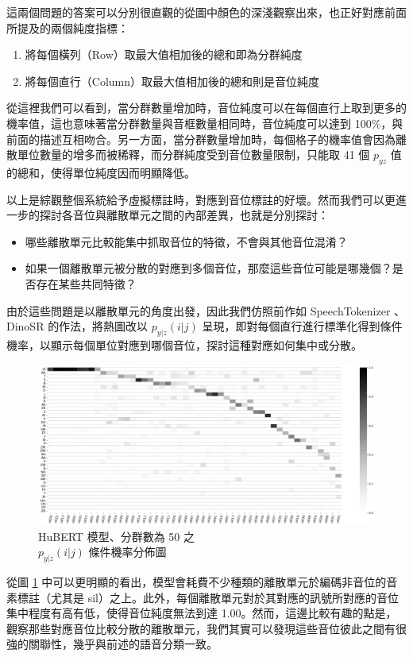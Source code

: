 {        這兩個問題的答案可以分別很直觀的從圖中顏色的深淺觀察出來，也正好對應前面所提及的兩個純度指標：
        \begin{enumerate}
            \item 將每個橫列（Row）取最大值相加後的總和即為分群純度
            \item 將每個直行（Column）取最大值相加後的總和則是音位純度
        \end{enumerate}

        從這裡我們可以看到，當分群數量增加時，音位純度可以在每個直行上取到更多的機率值，這也意味著當分群數量與音框數量相同時，音位純度可以達到 100\%，與前面的描述互相吻合。另一方面，當分群數量增加時，每個格子的機率值會因為離散單位數量的增多而被稀釋，而分群純度受到音位數量限制，只能取 41 個 $p_{yz}$ 值的總和，使得單位純度因而明顯降低。

        以上是綜觀整個系統給予虛擬標註時，對應到音位標註的好壞。然而我們可以更進一步的探討各音位與離散單元之間的內部差異，也就是分別探討：
\begin{itemize}
    \item 哪些離散單元比較能集中抓取音位的特徵，不會與其他音位混淆？
    \item 如果一個離散單元被分散的對應到多個音位，那麼這些音位可能是哪幾個？是否存在某些共同特徵？
\end{itemize}

        由於這些問題是以離散單元的角度出發，因此我們仿照前作如 SpeechTokenizer \cite{zhang2024speechtokenizer}、DinoSR \cite{liu2024dinosr} 的作法，將熱圖改以 $p_{y|z}(i|j)$ 呈現，即對每個直行進行標準化得到條件機率，以顯示每個單位對應到哪個音位，探討這種對應如何集中或分散。

\begin{figure}
    \centering
    \includegraphics[width=1\linewidth]{figures/11111111.png}
    \caption{HuBERT 模型、分群數為 50 之\\
$p_{y|z}(i|j)$  條件機率分佈圖}
    \label{fig:hubert-50-givenunit-byprob}
\end{figure}
        從圖 \ref{fig:hubert-50-givenunit-byprob} 中可以更明顯的看出，模型會耗費不少種類的離散單元於編碼非音位的音素標註（尤其是 sil）之上。此外，每個離散單元對於其對應的訊號所對應的音位集中程度有高有低，使得音位純度無法到達 1.00。然而，這邊比較有趣的點是，觀察那些對應音位比較分散的離散單元，我們其實可以發現這些音位彼此之間有很強的關聯性，幾乎與前述的語音分類一致。  %

}
